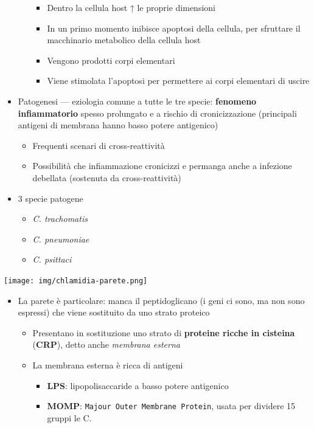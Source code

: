 \documentclass[italian,]{article}
\providecommand{\tightlist}{%
  \setlength{\itemsep}{0pt}\setlength{\parskip}{0pt}}
\newcommand{\normalbox}[2]{\begin{tcolorbox}[title=#1]#2\end{tcolorbox}} %
\begin{document}
\begin{itemize}
\begin{enumerate}
    \begin{itemize}
    \tightlist
    \item
      Dentro la cellula host ↑ le proprie dimensioni
    \item
      In un primo momento inibisce apoptosi della cellula, per sfruttare
      il macchinario metabolico della cellula host
    \item
      Vengono prodotti corpi elementari
    \item
      Viene stimolata l'apoptosi per permettere ai corpi elementari di
      uscire
    \end{itemize}
  \end{enumerate}
\item
  Patogenesi --- eziologia comune a tutte le tre specie:
  \textbf{fenomeno infiammatorio} spesso prolungato e a rischio di
  cronicizzazione (principali antigeni di membrana hanno basso potere
  antigenico)

  \begin{itemize}
  \tightlist
  \item
    Frequenti scenari di cross-reattività
  \item
    Possibilità che infiammazione cronicizzi e permanga anche a
    infezione debellata (sostenuta da cross-reattività)
  \end{itemize}
\item
  3 specie patogene

  \begin{itemize}
  \tightlist
  \item
    \emph{C. trachomatis}
  \item
    \emph{C. pneumoniae}
  \item
    \emph{C. psittaci}
  \end{itemize}
\end{itemize}

\normalbox{La parete delle \emph{Chlamydiae}}{
\texttt{[image: img/chlamidia-parete.png]}~
\begin{itemize}
\tightlist
\item La parete è particolare: manca il peptidoglicano (i geni ci sono, ma non sono espressi) che viene sostituito da uno strato proteico
  \begin{itemize}
  \tightlist
  \item Presentano in sostituzione uno strato di \textbf{proteine ricche in cisteina} (\textbf{CRP}), detto anche \emph{membrana esterna}
  \item La membrana esterna è ricca di antigeni
    \begin{itemize}
    \tightlist
    \item \textbf{LPS}: lipopolisaccaride a basso potere antigenico
    \item \textbf{MOMP}: \texttt{Majour\ Outer\ Membrane\ Protein}, usata per dividere 15 gruppi le C.
    \end{itemize}
  \end{itemize}
\end{itemize}
}
\end{document}
